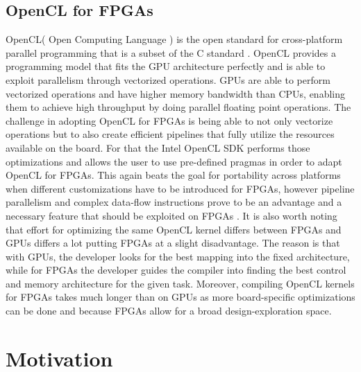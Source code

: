 \subsection{OpenCL for FPGAs}
OpenCL\texttrademark ( Open Computing Language ) is the open standard for cross-platform parallel programming that is a subset of the C standard \cite{opencl}. OpenCL provides a programming model that fits the GPU architecture perfectly and is able to exploit parallelism through vectorized operations. GPUs are able to perform vectorized operations and have higher memory bandwidth than CPUs, enabling them to achieve high throughput by doing parallel floating point operations. The challenge in adopting OpenCL for FPGAs is being able to not only vectorize operations but to also create efficient pipelines that fully utilize the resources available on the board. For that the Intel OpenCL SDK \cite{intel2016sdk, deepfpga} performs those optimizations and allows the user to use pre-defined pragmas in order to adapt OpenCL for FPGAs. This again beats the goal for portability across platforms when different customizations have to be introduced for FPGAs, however pipeline parallelism and complex data-flow instructions prove to be an advantage and a necessary feature that should be exploited on FPGAs \cite{ddl, deepfpga}.  It is also worth noting that effort for optimizing the same OpenCL kernel differs between FPGAs and GPUs differs a lot putting FPGAs at a slight disadvantage. The reason is that with GPUs, the developer looks for the best mapping into the fixed architecture, while for FPGAs the developer guides the compiler into finding the best control and memory architecture for the given task. Moreover, compiling OpenCL kernels for FPGAs takes much longer than on GPUs as more board-specific optimizations can be done and because FPGAs allow for a broad design-exploration space.



\section{Motivation}

